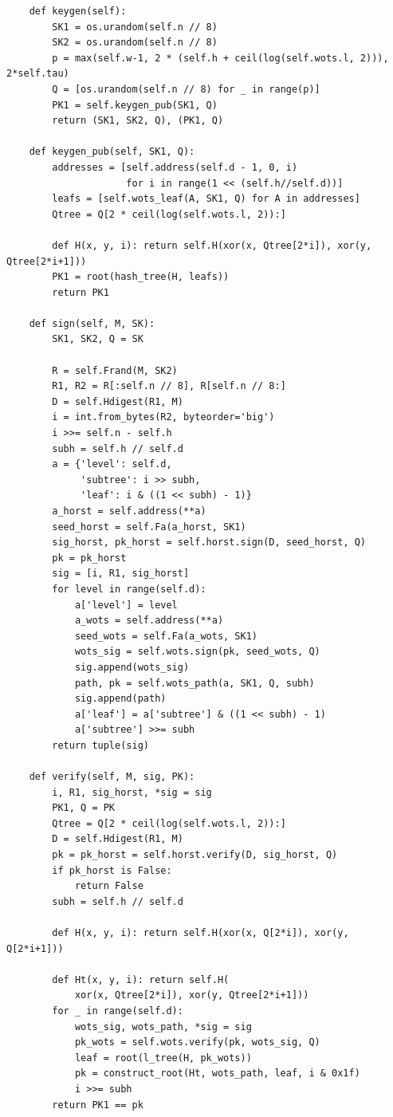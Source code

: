 \documentclass[a4paper, 14pt]{extarticle}
\begin{document}
\begin{verbatim}
    def keygen(self):
        SK1 = os.urandom(self.n // 8)
        SK2 = os.urandom(self.n // 8)
        p = max(self.w-1, 2 * (self.h + ceil(log(self.wots.l, 2))), 2*self.tau)
        Q = [os.urandom(self.n // 8) for _ in range(p)]
        PK1 = self.keygen_pub(SK1, Q)
        return (SK1, SK2, Q), (PK1, Q)

    def keygen_pub(self, SK1, Q):
        addresses = [self.address(self.d - 1, 0, i)
                     for i in range(1 << (self.h//self.d))]
        leafs = [self.wots_leaf(A, SK1, Q) for A in addresses]
        Qtree = Q[2 * ceil(log(self.wots.l, 2)):]

        def H(x, y, i): return self.H(xor(x, Qtree[2*i]), xor(y, Qtree[2*i+1]))
        PK1 = root(hash_tree(H, leafs))
        return PK1

    def sign(self, M, SK):
        SK1, SK2, Q = SK

        R = self.Frand(M, SK2)
        R1, R2 = R[:self.n // 8], R[self.n // 8:]
        D = self.Hdigest(R1, M)
        i = int.from_bytes(R2, byteorder='big')
        i >>= self.n - self.h
        subh = self.h // self.d
        a = {'level': self.d,
             'subtree': i >> subh,
             'leaf': i & ((1 << subh) - 1)}
        a_horst = self.address(**a)
        seed_horst = self.Fa(a_horst, SK1)
        sig_horst, pk_horst = self.horst.sign(D, seed_horst, Q)
        pk = pk_horst
        sig = [i, R1, sig_horst]
        for level in range(self.d):
            a['level'] = level
            a_wots = self.address(**a)
            seed_wots = self.Fa(a_wots, SK1)
            wots_sig = self.wots.sign(pk, seed_wots, Q)
            sig.append(wots_sig)
            path, pk = self.wots_path(a, SK1, Q, subh)
            sig.append(path)
            a['leaf'] = a['subtree'] & ((1 << subh) - 1)
            a['subtree'] >>= subh
        return tuple(sig)

    def verify(self, M, sig, PK):
        i, R1, sig_horst, *sig = sig
        PK1, Q = PK
        Qtree = Q[2 * ceil(log(self.wots.l, 2)):]
        D = self.Hdigest(R1, M)
        pk = pk_horst = self.horst.verify(D, sig_horst, Q)
        if pk_horst is False:
            return False
        subh = self.h // self.d

        def H(x, y, i): return self.H(xor(x, Q[2*i]), xor(y, Q[2*i+1]))

        def Ht(x, y, i): return self.H(
            xor(x, Qtree[2*i]), xor(y, Qtree[2*i+1]))
        for _ in range(self.d):
            wots_sig, wots_path, *sig = sig
            pk_wots = self.wots.verify(pk, wots_sig, Q)
            leaf = root(l_tree(H, pk_wots))
            pk = construct_root(Ht, wots_path, leaf, i & 0x1f)
            i >>= subh
        return PK1 == pk
\end{verbatim}
\newpage
\end{document}
